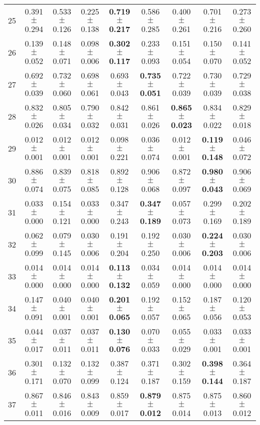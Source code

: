 \begin{table}[!ht]
{\begin{tabular}{r c c c c c c c c}
25 & 0.391 $\pm$ 0.294 & 0.533 $\pm$ 0.126 & 0.225 $\pm$ 0.138 & \textbf{0.719 $\pm$ 0.217} & 0.586 $\pm$ 0.285 & 0.400 $\pm$ 0.261 & 0.701 $\pm$ 0.216 & 0.273 $\pm$ 0.260 \\
26 & 0.139 $\pm$ 0.052 & 0.148 $\pm$ 0.071 & 0.098 $\pm$ 0.006 & \textbf{0.302 $\pm$ 0.117} & 0.233 $\pm$ 0.093 & 0.151 $\pm$ 0.054 & 0.150 $\pm$ 0.070 & 0.141 $\pm$ 0.052 \\
27 & 0.692 $\pm$ 0.039 & 0.732 $\pm$ 0.060 & 0.698 $\pm$ 0.061 & 0.693 $\pm$ 0.043 & \textbf{0.735 $\pm$ 0.051} & 0.722 $\pm$ 0.039 & 0.730 $\pm$ 0.039 & 0.729 $\pm$ 0.038 \\
28 & 0.832 $\pm$ 0.026 & 0.805 $\pm$ 0.034 & 0.790 $\pm$ 0.032 & 0.842 $\pm$ 0.031 & 0.861 $\pm$ 0.026 & \textbf{0.865 $\pm$ 0.023} & 0.834 $\pm$ 0.022 & 0.829 $\pm$ 0.018 \\
29 & 0.012 $\pm$ 0.001 & 0.012 $\pm$ 0.001 & 0.012 $\pm$ 0.001 & 0.098 $\pm$ 0.221 & 0.036 $\pm$ 0.074 & 0.012 $\pm$ 0.001 & \textbf{0.119 $\pm$ 0.148} & 0.046 $\pm$ 0.072 \\
30 & 0.886 $\pm$ 0.074 & 0.839 $\pm$ 0.075 & 0.818 $\pm$ 0.085 & 0.892 $\pm$ 0.128 & 0.906 $\pm$ 0.068 & 0.872 $\pm$ 0.097 & \textbf{0.980 $\pm$ 0.043} & 0.906 $\pm$ 0.069 \\
31 & 0.033 $\pm$ 0.000 & 0.154 $\pm$ 0.121 & 0.033 $\pm$ 0.000 & 0.347 $\pm$ 0.243 & \textbf{0.347 $\pm$ 0.189} & 0.057 $\pm$ 0.073 & 0.299 $\pm$ 0.169 & 0.202 $\pm$ 0.189 \\
32 & 0.062 $\pm$ 0.099 & 0.079 $\pm$ 0.145 & 0.030 $\pm$ 0.006 & 0.191 $\pm$ 0.204 & 0.192 $\pm$ 0.250 & 0.030 $\pm$ 0.006 & \textbf{0.224 $\pm$ 0.203} & 0.030 $\pm$ 0.006 \\
33 & 0.014 $\pm$ 0.000 & 0.014 $\pm$ 0.000 & 0.014 $\pm$ 0.000 & \textbf{0.113 $\pm$ 0.132} & 0.034 $\pm$ 0.059 & 0.014 $\pm$ 0.000 & 0.014 $\pm$ 0.000 & 0.014 $\pm$ 0.000 \\
34 & 0.147 $\pm$ 0.091 & 0.040 $\pm$ 0.001 & 0.040 $\pm$ 0.001 & \textbf{0.201 $\pm$ 0.065} & 0.192 $\pm$ 0.057 & 0.152 $\pm$ 0.065 & 0.187 $\pm$ 0.056 & 0.120 $\pm$ 0.053 \\
35 & 0.044 $\pm$ 0.017 & 0.037 $\pm$ 0.011 & 0.037 $\pm$ 0.011 & \textbf{0.130 $\pm$ 0.076} & 0.070 $\pm$ 0.033 & 0.055 $\pm$ 0.029 & 0.033 $\pm$ 0.001 & 0.033 $\pm$ 0.001 \\
36 & 0.301 $\pm$ 0.171 & 0.132 $\pm$ 0.070 & 0.132 $\pm$ 0.099 & 0.387 $\pm$ 0.124 & 0.371 $\pm$ 0.187 & 0.302 $\pm$ 0.159 & \textbf{0.398 $\pm$ 0.144} & 0.364 $\pm$ 0.187 \\
37 & 0.867 $\pm$ 0.011 & 0.846 $\pm$ 0.016 & 0.843 $\pm$ 0.009 & 0.859 $\pm$ 0.017 & \textbf{0.879 $\pm$ 0.012} & 0.875 $\pm$ 0.014 & 0.875 $\pm$ 0.013 & 0.860 $\pm$ 0.012 \\

\end{tabular}}
\end{table}
